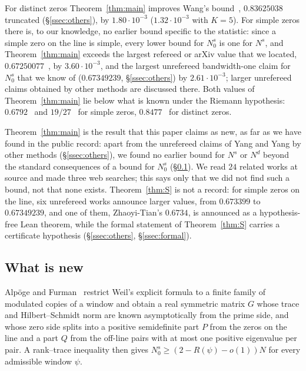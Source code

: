 For distinct zeros Theorem~\ref{thm:main} improves Wang's bound~\cite{Wang24167}, $0.83625038$ truncated (\S\ref{ssec:others}), by
$1.80\cdot10^{-3}$ ($1.32\cdot10^{-3}$ with $K=5$).
For simple zeros there is, to our knowledge, no earlier bound specific to the statistic: since a simple zero on the line is simple, every lower
bound for $N_0^s$ is one for $N^s$, and Theorem~\ref{thm:main} exceeds the largest refereed or arXiv value that we located, $0.67250077$~\cite{Wang24167}, by
$3.60\cdot10^{-3}$, and the largest unrefereed bandwidth-one claim for $N_0^s$ that we know of ($0.67349239$, \S\ref{ssec:others}) by
$2.61\cdot10^{-3}$; larger unrefereed claims obtained by other methods are discussed there.
Both values of Theorem~\ref{thm:main} lie below what is known under the Riemann hypothesis: $0.6792$~\cite{CGdL} and $19/27$~\cite{BHB} for
simple zeros, $0.8477$~\cite{CGdL} for distinct zeros.

Theorem~\ref{thm:main} is the result that this paper claims as new, as far as we have found in the public record: apart from the unrefereed
claims of Yang and Yang by other methods (\S\ref{ssec:others}), we found no earlier bound for $N^s$ or $N^d$ beyond the standard
consequences of a bound for $N_0^s$ (\S\ref{ssec:new}). We read $24$ related works at source and made three web searches; this says only
that we did not find such a bound, not that none exists. Theorem~\ref{thm:S} is not a record: for simple zeros on the line, six unrefereed
works announce larger values, from $0.673399$ to $0.67349239$, and one of them, Zhaoyi-Tian's $0.6734$, is announced as a hypothesis-free
Lean theorem, while the formal statement of Theorem~\ref{thm:S} carries a certificate hypothesis (\S\ref{ssec:others},
\S\ref{ssec:formal}).

\subsection{What is new}\label{ssec:new}
Alp\"oge and Furman~\cite{AF} restrict Weil's explicit formula to a finite family of modulated copies of a window and obtain a real symmetric
matrix $G$ whose trace and Hilbert--Schmidt norm are known asymptotically from the prime side, and whose zero side splits into a positive
semidefinite part $P$ from the zeros on the line and a part $Q$ from the off-line pairs with at most one positive eigenvalue per pair.
A rank--trace inequality then gives $N_0^s\ge(2-R(\psi)-o(1))N$ for every admissible window $\psi$.

